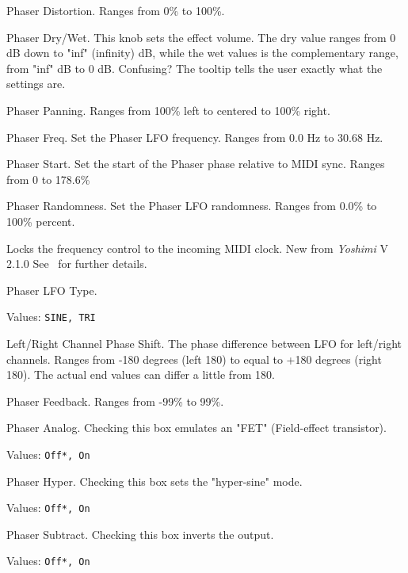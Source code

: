    Phaser Distortion.
   Ranges from 0\% to 100\%.

   Phaser Dry/Wet.
   This knob sets the effect volume.  The dry value ranges from 0 dB down to
   "inf" (infinity) dB, while the wet values is the complementary range, from
   "inf" dB to 0 dB.  Confusing?  The tooltip tells the user exactly what the
   settings are.

   Phaser Panning.
   Ranges from 100\% left to centered to 100\% right.

   Phaser Freq.
   Set the Phaser LFO frequency.
   Ranges from 0.0 Hz to 30.68 Hz.

   Phaser Start.
   Set the start of the Phaser phase relative to MIDI sync.
   Ranges from 0 to 178.6\%

   Phaser Randomness.
   Set the Phaser LFO randomness.
   Ranges from 0.0\% to 100\% percent.

   Locks the frequency control to the incoming MIDI clock. New from
   \textsl{Yoshimi} V 2.1.0 See
   \ for further details.

   Phaser LFO Type.

   Values: \texttt{SINE, TRI}

   Left/Right Channel Phase Shift.
   The phase difference between LFO for left/right channels.
   Ranges from -180 degrees (left 180) to equal to +180 degrees (right 180).
   The actual end values can differ a little from 180.

   Phaser Feedback.
   Ranges from -99\% to 99\%.

   Phaser Analog.
   Checking this box emulates an "FET"  (Field-effect transistor).

   Values: \texttt{Off*, On}

   Phaser Hyper.
   Checking this box sets the "hyper-sine" mode.

   Values: \texttt{Off*, On}

   Phaser Subtract.
   Checking this box inverts the output.

   Values: \texttt{Off*, On}

